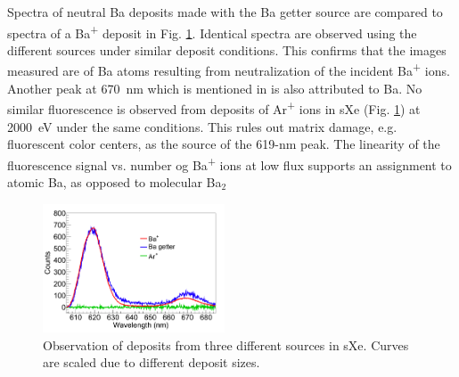 \documentclass[aps,pra,reprint,superscriptaddress]{revtex4-1}
\begin{document}
Spectra of neutral Ba deposits made with the Ba getter source are compared to spectra of a Ba\textsuperscript{+} deposit in Fig. \ref{fig:ion_getter_ar}.  Identical spectra are observed using the different sources under similar deposit conditions.  This confirms that the images measured are of Ba atoms resulting from neutralization of the incident Ba\textsuperscript{+} ions.  Another peak at 670~nm which is mentioned in \cite{Mong2015} is also attributed to Ba.  No similar fluorescence is observed from deposits of Ar\textsuperscript{+} ions in sXe (Fig. \ref{fig:ion_getter_ar}) at 2000~eV under the same conditions.  This rules out matrix damage, e.g. fluorescent color centers, as the source of the 619-nm peak.  The linearity of the fluorescence signal vs. number og Ba\textsuperscript{+} ions at low flux supports an assignment to atomic Ba, as opposed to molecular Ba$_{2}$

\begin{figure}
\includegraphics[width=0.48\textwidth]{figures/getter_fromthesis_Ar_vs_Ba.png}
\caption{Observation of deposits from three different sources in sXe.  Curves are scaled due to different deposit sizes.}
\label{fig:ion_getter_ar}
\end{figure}


\end{document}
